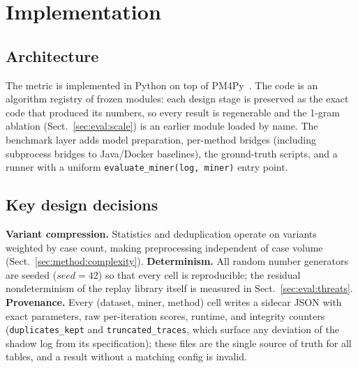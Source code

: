 \documentclass[runningheads]{llncs}
\newcommand{\chg}[1]{\textcolor{chgblue}{#1}}
\begin{document}
\section{Implementation}
\label{sec:impl}

\subsection{Architecture}
\label{sec:impl:arch}
The metric is implemented in Python on top of PM4Py~\cite{berti2019pm4py}. \chg{The code is an algorithm registry of frozen modules: each design stage is preserved as the exact code that produced its numbers, so every result is regenerable and the 1-gram ablation (Sect.~\ref{sec:eval:scale}) is an earlier module loaded by name.} The benchmark layer adds model preparation, per-method bridges (including subprocess bridges to Java/Docker baselines), the ground-truth scripts, and \chg{a runner with a uniform \texttt{evaluate\_miner(log, miner)} entry point}.

\subsection{Key design decisions}
\label{sec:impl:decisions}
\textbf{Variant compression.} Statistics and deduplication operate on variants weighted by case count, making preprocessing independent of case volume (Sect.~\ref{sec:method:complexity}). \textbf{Determinism.} All random number generators are seeded ($\mathit{seed}{=}42$) so that every cell is reproducible\chg{; the residual nondeterminism of the replay library itself is measured in Sect.~\ref{sec:eval:threats}}. \textbf{Provenance.} Every (dataset, miner, method) cell writes a sidecar JSON with exact parameters, raw per-iteration scores, runtime, and integrity counters (\texttt{duplicates\_kept} and \texttt{truncated\_traces}, which surface any deviation of the shadow log from its specification); these files are the single source of truth for all tables, and a result without a matching config is invalid.
\end{document}
